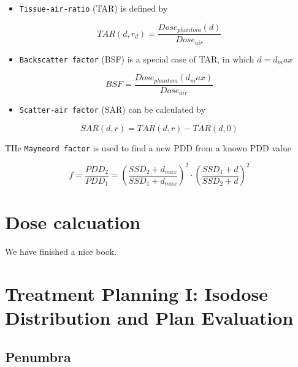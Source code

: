 \documentclass[]{book}
\providecommand{\tightlist}{%
  \setlength{\itemsep}{0pt}\setlength{\parskip}{0pt}}
\theoremstyle{definition}
\theoremstyle{definition}
\theoremstyle{definition}
\theoremstyle{remark}
\begin{document}
\begin{itemize}
\tightlist
\item
  \texttt{Tissue-air-ratio} (TAR) is defined by
\end{itemize}

\begin{equation}
  TAR(d,r_d) = \frac{Dose_{phantom}(d)}{Dose_{air}}
  \label{eq:tar}
\end{equation}

\begin{itemize}
\tightlist
\item
  \texttt{Backscatter\ factor} (BSF) is a special case of TAR, in which
  \(d=d_max\)
\end{itemize}

\begin{equation}
  BSF = \frac{Dose_{phantom}(d_max)}{Dose_{air}}
  \label{eq:bsf}
\end{equation}

\begin{itemize}
\tightlist
\item
  \texttt{Scatter-air\ factor} (SAR) can be calculated by
\end{itemize}

\begin{equation}
  SAR(d,r) = TAR(d,r)-TAR(d,0)
  \label{eq:sar}
\end{equation}

THe \texttt{Mayneord\ factor} is used to find a new PDD from a known PDD
value

\begin{equation}
  f = \frac{PDD_2}{PDD_1} =\left( \frac{SSD_2+d_{max}}{SSD_1+d_{max}} \right)^2  \cdot \left( \frac{SSD_1+d}{SSD_2+d} \right)^2  
  \label{eq:mayneord}
\end{equation}

\chapter{Dose calcuation}\label{dosecalc}

We have finished a nice book.

\chapter{Treatment Planning I: Isodose Distribution and Plan
Evaluation}\label{planning1}

\section{Penumbra}\label{penumbra-1}
\end{document}

